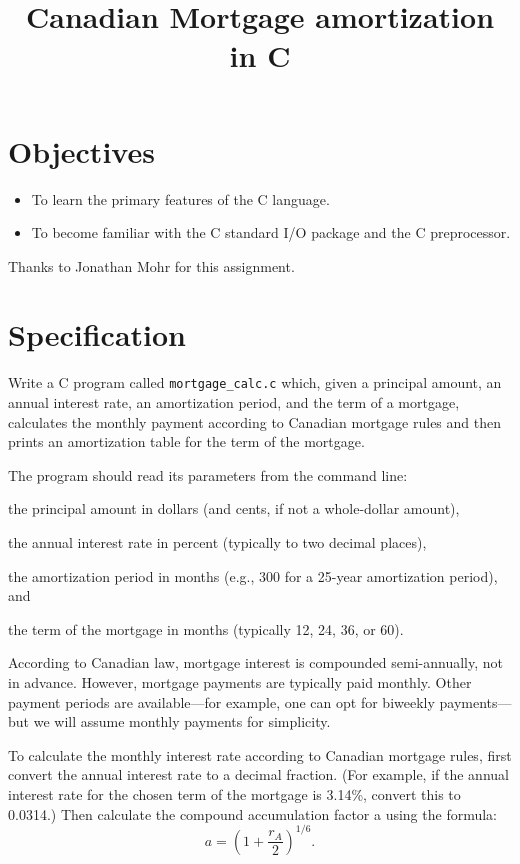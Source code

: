 \documentclass[12pt,info]{asg}
\title{Canadian Mortgage amortization in C}
\begin{document}
\maketitle
\section*{Objectives}
\begin{itemize}
\item To learn the primary features of the C language.
\item To become familiar with the C standard I/O package and the C preprocessor.
\end{itemize}

Thanks to Jonathan Mohr for this assignment.

\section*{Specification}

Write a C program called \texttt{mortgage\_calc.c} which, given a principal amount, an annual interest rate, an amortization period, and the term of a mortgage, calculates the monthly payment according to Canadian mortgage rules and then prints an amortization table for the term of the mortgage.

The program should read its parameters from the command line: 
\begin{compactlist}
\item the principal amount in dollars (and cents, if not a whole-dollar amount), 
\item the annual interest rate in percent (typically to two decimal places), 
\item the amortization period in months (e.g., 300 for a 25-year amortization period), and 
\item the term of the mortgage in months (typically 12, 24, 36, or 60).
\end{compactlist}

According to Canadian law, mortgage interest is compounded semi-annually, not in advance. However, mortgage payments are typically paid monthly. Other payment periods are available---for example, one can opt for biweekly payments---but we will assume monthly payments for simplicity.

To calculate the monthly interest rate according to Canadian mortgage rules, first convert the annual interest rate to a decimal fraction. (For example, if the annual interest rate for the chosen term of the mortgage is 3.14\%, convert this to 0.0314.) Then calculate the compound accumulation factor a using the formula:
\begin{equation}
a = \left(1+\frac{r_A}{2}\right)^{1/6}.
\end{equation}
\end{document}
